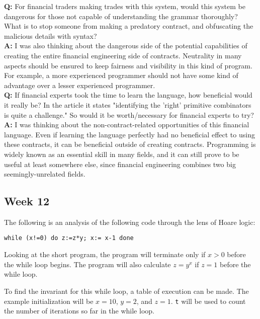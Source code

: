 \documentclass{article}
\theoremstyle{theorem}
\theoremstyle{definition}
\theoremstyle{remark}
\begin{document}
\textbf{Q:} For financial traders making trades with this system, would this system be dangerous for those not capable of understanding the grammar thoroughly? What is to stop someone from making a predatory contract, and obfuscating the malicious details with syntax?\\

\textbf{A:} I was also thinking about the dangerous side of the potential capabilities of creating the entire financial engineering side of contracts. Neutrality in many aspects should be ensured to keep fairness and visibility in this kind of program. For example, a more experienced programmer should not have some kind of advantage over a lesser experienced programmer.\\

\textbf{Q:} If financial experts took the time to learn the language, how beneficial would it really be? In the article it states "identifying the 'right' primitive combinators is quite a challenge." So would it be worth/necessary for financial experts to try? \\

\textbf{A:} I was thinking about the non-contract-related opportunities of this financial language. Even if learning the language perfectly had no beneficial effect to using these contracts, it can be beneficial outside of creating contracts. Programming is widely known as an essential skill in many fields, and it can still prove to be useful at least somewhere else, since financial engineering combines two big seemingly-unrelated fields.

\newpage
\subsection{Week 12}

The following is an analysis of the following code through the lens of Hoare logic:

\texttt{while (x!=0) do z:=z*y;  x:= x-1 done}

Looking at the short program, the program will terminate only if $x > 0$ before the while loop begins. The program will also calculate $z = y^x$ if $z = 1$ before the while loop.

To find the invariant for this while loop, a table of execution can be made. The example initialization will be $x = 10$, $y = 2$, and $z = 1$. \texttt{t} will be used to count the number of iterations so far in the while loop.
\end{document}
